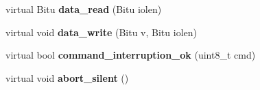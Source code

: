 \begin{DoxyCompactItemize}
\item 
\hypertarget{classIDEDevice_a9f147d38ce4c8aabe599a8824e7255cf}{virtual Bitu {\bfseries data\-\_\-read} (Bitu iolen)}\label{classIDEDevice_a9f147d38ce4c8aabe599a8824e7255cf}

\item 
\hypertarget{classIDEDevice_a640b4f061398634fb3586b2517024d98}{virtual void {\bfseries data\-\_\-write} (Bitu v, Bitu iolen)}\label{classIDEDevice_a640b4f061398634fb3586b2517024d98}

\item 
\hypertarget{classIDEDevice_ada3a9a93b6475e35a5be4ef089fd403e}{virtual bool {\bfseries command\-\_\-interruption\-\_\-ok} (uint8\-\_\-t cmd)}\label{classIDEDevice_ada3a9a93b6475e35a5be4ef089fd403e}

\item 
\hypertarget{classIDEDevice_ad0c44b8192299266c03668a35dde9126}{virtual void {\bfseries abort\-\_\-silent} ()}\label{classIDEDevice_ad0c44b8192299266c03668a35dde9126}

\end{DoxyCompactItemize}
